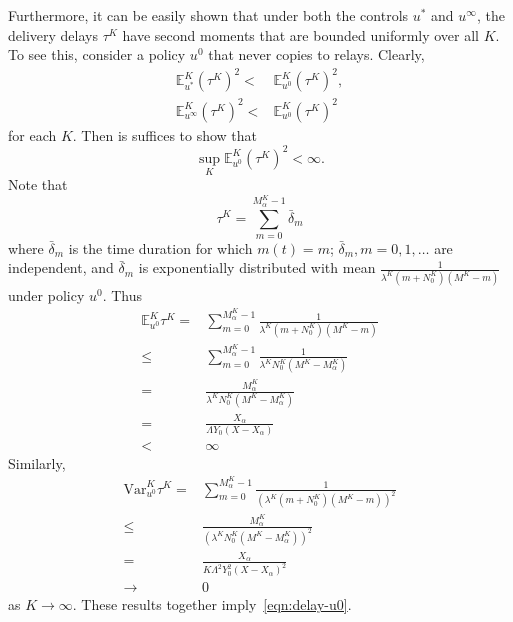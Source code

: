 \documentclass[10pt,journal,letterpaper]{IEEEtran}
\newcommand{\remove}[1]{}
\begin{document}
\remove{
Furthermore, it can be easily shown that under both the controls $u^{\ast}$ and $u^{\infty}$,
the delivery delays $\tau^K$ have second moments which are bounded uniformly over all $K$, i.e.,\footnote{The proof entails
binding $\tau^K$~(under the control $u^{\ast}$ or $u^{\infty}$) by the delivery delays under the policy that never
copies to relays, and showing that the latter have second moments which are bounded uniformly over all $K$.}
\begin{align*}
\sup_K\mathbb{E}^K_{u^{\ast}}(\tau^K)^2 < \infty,\\
\sup_K\mathbb{E}^K_{u^{\infty}}(\tau^K)^2 < \infty.
\end{align*}
}
Furthermore, it can be easily shown that under both the controls $u^{\ast}$ and $u^{\infty}$,
the delivery delays $\tau^K$ have second moments that are bounded uniformly over all $K$. To see this,
consider a policy $u^0$ that never copies to relays. Clearly,
\begin{align*}
\mathbb{E}^K_{u^{\ast}}(\tau^K)^2 < &\mathbb{E}^K_{u^0}(\tau^K)^2,\\
\mathbb{E}^K_{u^{\infty}}(\tau^K)^2 < &\mathbb{E}^K_{u^0}(\tau^K)^2
\end{align*}
for each $K$. Then is suffices to show that
\begin{equation}
\sup_K\mathbb{E}^K_{u^0}(\tau^K)^2 < \infty. \label{eqn:delay-u0}
\end{equation}
Note that
\begin{equation*}
\tau^K = \sum_{m = 0}^{M^K_{\alpha}-1}\bar{\delta}_m
\end{equation*}
where $\bar{\delta}_m$ is the time duration for which $m(t) = m$; $\bar{\delta}_m, m = 0,1,\dots$ are independent,
and $\bar{\delta}_m$  is exponentially distributed with mean
$\frac{1}{\lambda^K(m + N^K_0)(M^K - m)}$ under policy  $u^0$.
Thus
\begin{align*}
\mathbb{E}^K_{u^0}\tau^K = &\sum_{m = 0}^{M^K_{\alpha}-1}\frac{1}{\lambda^K(m + N^K_0)(M^K - m)} \\
                         \leq &\sum_{m = 0}^{M^K_{\alpha}-1}\frac{1}{\lambda^K N^K_0(M^K - M^K_{\alpha})} \\
                         = & \frac{M^K_{\alpha}}{\lambda^K N^K_0 (M^K - M^K_{\alpha})} \\
                         = &\frac{X_{\alpha}}{\Lambda Y_0(X - X_{\alpha})} \\
                         < &\infty
\end{align*}
Similarly,
\begin{align*}
\mbox{Var}^K_{u^0}\tau^K = &\sum_{m = 0}^{M^K_{\alpha}-1}\frac{1}{\left(\lambda^K(m + N^K_0)(M^K - m)\right)^2} \\
                        \leq & \frac{M^K_{\alpha}}{\left(\lambda^K N^K_0 (M^K - M^K_{\alpha})\right)^2} \\
                         = &\frac{X_{\alpha}}{K\Lambda^2 Y^2_0(X - X_{\alpha})^2} \\
                         \rightarrow & 0
\end{align*}
as $K \rightarrow \infty$. These results together imply~\eqref{eqn:delay-u0}.
\end{document}
